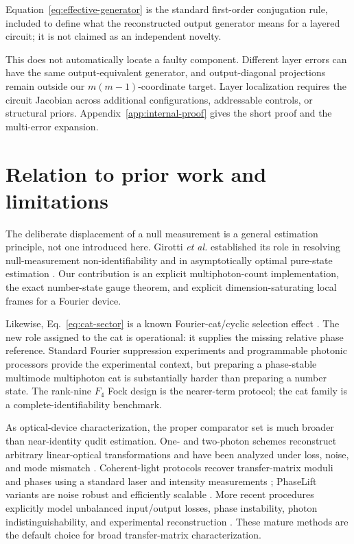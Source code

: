 \documentclass[aps,pra,reprint,amsmath,amssymb,superscriptaddress,longbibliography]{revtex4-2}
\begin{document}
Equation~\eqref{eq:effective-generator} is the standard first-order
conjugation rule, included to define what the reconstructed output generator
means for a layered circuit; it is not claimed as an independent novelty.

This does not automatically locate a faulty component.  Different layer
errors can have the same output-equivalent generator, and output-diagonal
projections remain outside our $m(m-1)$-coordinate target.  Layer localization
requires the circuit Jacobian across additional configurations, addressable
controls, or structural priors.  Appendix~\ref{app:internal-proof} gives the
short proof and the multi-error expansion.

\section{Relation to prior work and limitations}
\label{sec:limitations}

The deliberate displacement of a null measurement is a general estimation
principle, not one introduced here.  Girotti \emph{et al.} established its
role in resolving null-measurement non-identifiability and in asymptotically
optimal pure-state estimation \cite{Girotti2024}.  Our contribution is an
explicit multiphoton-count implementation, the exact number-state gauge
theorem, and explicit dimension-saturating local frames for a Fourier
device.

Likewise, Eq.~\eqref{eq:cat-sector} is a known Fourier-cat/cyclic selection
effect \cite{VourdasDunningham2005,Dittel2018PRA}.  The new role assigned to
the cat is operational: it supplies the missing relative phase reference.
Standard Fourier suppression experiments
\cite{Tichy2010,Crespi2016,Dittel2018PRL} and programmable photonic
processors \cite{Arrazola2021,Wang2023} provide the experimental context,
but preparing a phase-stable multimode multiphoton cat is substantially
harder than preparing a number state.  The rank-nine $F_4$ Fock design is
the nearer-term protocol; the cat family is a complete-identifiability
benchmark.

As optical-device characterization, the proper comparator set is much
broader than near-identity qudit estimation.  One- and two-photon schemes
reconstruct arbitrary linear-optical transformations and have been analyzed
under loss, noise, and mode mismatch
\cite{LaingOBrien2012,Dhand2016}.  Coherent-light protocols recover
transfer-matrix moduli and phases using a standard laser and intensity
measurements \cite{RahimiKeshari2013}; PhaseLift variants are noise robust
and efficiently scalable \cite{Suess2020}.  More recent procedures explicitly
model unbalanced input/output losses, phase instability, photon
indistinguishability, and experimental reconstruction
\cite{Hoch2023,Biriukov2026}.  These mature methods are the default choice
for broad transfer-matrix characterization.
\end{document}
